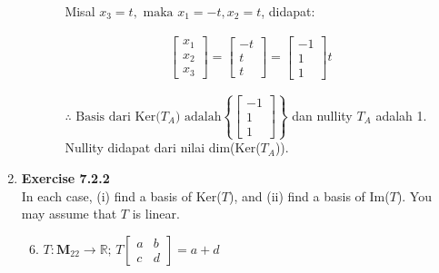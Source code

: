 \documentclass[12pt, a4paper]{scrartcl}
\begin{document}
\begin{enumerate}
\begin{enumerate}
            \begin{itemize}
                \item[] Misal $x_3 = t, \mbox{ maka } x_1=-t, x_2=t$, didapat:
            \end{itemize}
            \begin{align*}
                \begin{bmatrix}
                    x_1\\x_2\\x_3
                \end{bmatrix} = \begin{bmatrix}
                    -t\\t\\t
                \end{bmatrix} = \begin{bmatrix}
                    -1\\1\\1
                \end{bmatrix}t
            \end{align*}

            \begin{itemize}
                \item[$\therefore$] $\mbox{Basis dari Ker(}T_A \mbox{) adalah} \left\{ \begin{bmatrix}
                    -1\\1\\1
                \end{bmatrix} \right\}$ dan nullity $T_A$ adalah 1. Nullity didapat dari nilai dim(Ker($T_A$)). 
            \end{itemize}            
            
        \end{enumerate}

        \item \textbf{Exercise 7.2.2}\\In each case, (i) find a basis of Ker($T$), and (ii) find a basis of Im($T$). You may assume that $T$ is linear.
        \begin{enumerate}
            \setcounter{enumii}{5}
            \item $T : \textbf{M}_{22} \to \mathbb{R} \mbox{; } T \begin{bmatrix}
                a & b\\
                c & d
            \end{bmatrix} = a + d$


\end{enumerate}
\end{enumerate}
\end{document}
